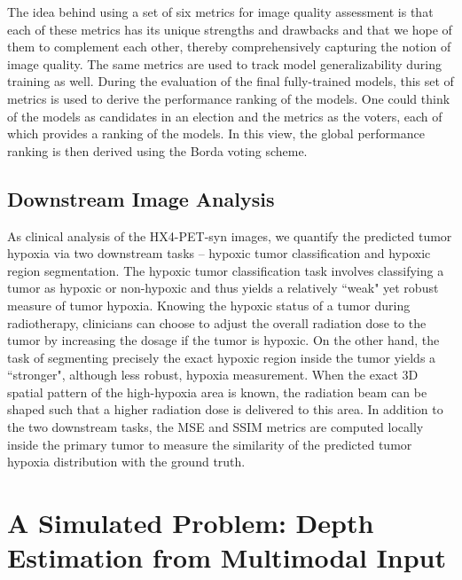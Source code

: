 The idea behind using a set of six metrics for image quality assessment is that each of these metrics has its unique strengths and drawbacks and that we hope of them to complement each other, thereby comprehensively capturing the notion of image quality. The same metrics are used to track model generalizability during training as well. During the evaluation of the final fully-trained models, this set of metrics is used to derive the performance ranking of the models. One could think of the models as candidates in an election and the metrics as the voters, each of which provides a ranking of the models. In this view, the global performance ranking is then derived using the Borda voting scheme.


\subsection{Downstream Image Analysis}
As clinical analysis of the HX4-PET-syn images, we quantify the predicted tumor hypoxia via two downstream tasks -- hypoxic tumor classification and hypoxic region segmentation. The hypoxic tumor classification task involves classifying a tumor as hypoxic or non-hypoxic and thus yields a relatively ``weak" yet robust measure of tumor hypoxia. Knowing the hypoxic status of a tumor during radiotherapy, clinicians can choose to adjust the overall radiation dose to the tumor by increasing the dosage if the tumor is hypoxic. On the other hand, the task of segmenting precisely the exact hypoxic region inside the tumor yields a ``stronger", although less robust, hypoxia measurement. When the exact 3D spatial pattern of the high-hypoxia area is known, the radiation beam can be shaped such that a higher radiation dose is delivered to this area. In addition to the two downstream tasks, the MSE and SSIM metrics are computed locally inside the primary tumor to measure the similarity of the predicted tumor hypoxia distribution with the ground truth. 



\section{A Simulated Problem: Depth Estimation from Multimodal Input}
\label{ClearGrasp_Depth_Estimation}

